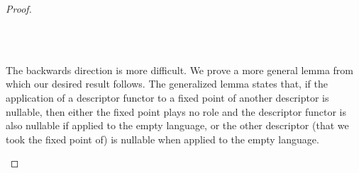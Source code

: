 \begin{proof}
\begin{code}[hide]
\AgdaInductiveConstructor{[]}\AgdaSpace{}%
\AgdaOperator{\AgdaInductiveConstructor{,}}\AgdaSpace{}%
\AgdaSpace{}%
\AgdaOperator{\AgdaInductiveConstructor{,}}\AgdaSpace{}%
\AgdaSpace{}%
\AgdaOperator{\AgdaInductiveConstructor{,}}\AgdaSpace{}%
\AgdaSymbol{)}\AgdaSpace{}%
\AgdaSymbol{=}\AgdaSpace{}%
\AgdaInductiveConstructor{[]}\AgdaSpace{}%
\AgdaOperator{\AgdaInductiveConstructor{,}}\AgdaSpace{}%
\AgdaInductiveConstructor{[]}\AgdaSpace{}%
\AgdaOperator{\AgdaInductiveConstructor{,}}\AgdaSpace{}%
\AgdaSpace{}%
\AgdaOperator{\AgdaInductiveConstructor{,}}\AgdaSpace{}%
\AgdaSpace{}%
\AgdaSpace{}%
\AgdaSpace{}%
\AgdaOperator{\AgdaInductiveConstructor{,}}\AgdaSpace{}%
\AgdaSpace{}%
\AgdaSpace{}%
\<%
\\
%
\>[4]\AgdaSpace{}%
\AgdaSymbol{(}\AgdaSpace{}%
\AgdaSpace{}%
\AgdaSymbol{)}\AgdaSpace{}%
\AgdaSymbol{(}\AgdaSpace{}%
\AgdaOperator{\AgdaInductiveConstructor{,}}\AgdaSpace{}%
\AgdaSymbol{)}\AgdaSpace{}%
\AgdaSymbol{=}\AgdaSpace{}%
\AgdaSpace{}%
\AgdaOperator{\AgdaInductiveConstructor{,}}\AgdaSpace{}%
\AgdaSpace{}%
\AgdaSpace{}%
\<%
\\
%
\>[4]\AgdaSpace{}%
\AgdaSymbol{(}\AgdaSpace{}%
\AgdaSymbol{)}\AgdaSpace{}%
\AgdaSpace{}%
\AgdaSymbol{=}\AgdaSpace{}%
\<%
\end{code}
The backwards direction is more difficult. We prove a more general lemma from which our desired result follows. The generalized lemma states that, if the application of a descriptor functor to a fixed point of another descriptor is nullable, then either the fixed point plays no role and the descriptor functor is also nullable if applied to the empty language, or the other descriptor (that we took the fixed point of) is nullable when applied to the empty language.
\begin{code}%
%
\>[4]\AgdaSpace{}%
\AgdaSymbol{:}\AgdaSpace{}%
\AgdaSpace{}%
\AgdaSpace{}%
\AgdaSpace{}%
\AgdaSpace{}%
\AgdaSymbol{(}\AgdaSpace{}%
\AgdaSpace{}%
\AgdaSpace{}%
\AgdaSpace{}%

\end{code}
\end{proof}
